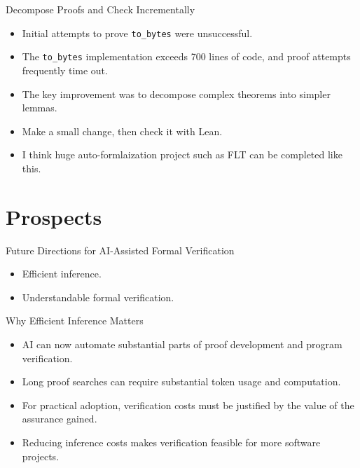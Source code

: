 \documentclass[aspectratio=169,xcolor=dvipsnames]{beamer}
\begin{document}
\begin{frame}{Decompose Proofs and Check Incrementally}
    \begin{itemize}
        \item Initial attempts to prove \texttt{to\_bytes} were unsuccessful.
        \item The \texttt{to\_bytes} implementation exceeds 700 lines of code, and proof attempts frequently time out.
        \item The key improvement was to decompose complex theorems into simpler lemmas.
        \item Make a small change, then check it with Lean.
        \item I think huge auto-formlaization project such as FLT can be completed like this.
    \end{itemize}
\end{frame}




\section{Prospects}

\begin{frame}{Future Directions for AI-Assisted Formal Verification}
    \begin{itemize}
        \item Efficient inference.
        \item Understandable formal verification.
    \end{itemize}
\end{frame}


\begin{frame}{Why Efficient Inference Matters}
    \begin{itemize}
        \item AI can now automate substantial parts of proof development and program verification.
        \item Long proof searches can require substantial token usage and computation.
        \item For practical adoption, verification costs must be justified by the value of the assurance gained.
        \item Reducing inference costs makes verification feasible for more software projects.
    \end{itemize}
\end{frame}
\end{document}
